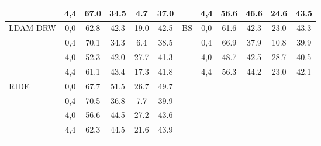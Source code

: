 \documentclass{article}
\newcommand{\thickhline}{\hlineB{4}}
\begin{document}
{\begin{table}[ht]
{{\begin{tabular}{l|c|cccc|l|c|cccc}
                          & 4,4            & 67.0                     & 34.5                    & 4.7                     & 37.0                    &                         & 4,4                  & 56.6                     & 46.6                    & 24.6                    & 43.5                    \\ \midrule
\multirow{4}{*}{LDAM-DRW} & 0,0            & 62.8                     & 42.3                    & 19.0                    & 42.5                    & \multirow{4}{*}{BS}     & 0,0                  & 61.6                     & 42.3                    & 23.0                    & 43.3                    \\
                          & 0,4            & 70.1                     & 34.3                    & 6.4                     & 38.5                    &                         & 0,4                  & 66.9                     & 37.9                    & 10.8                    & 39.9                    \\
                          & 4,0            & 52.3                     & 42.0                    & 27.7                    & 41.3                    &                         & 4,0                  & 48.7                     & 42.5                    & 28.7                    & 40.5                    \\
                          & 4,4            & 61.1                     & 43.4                    & 17.3                    & 41.8                    &                         & 4,4                  & 56.3                     & 44.2                    & 23.0                    & 42.1                    \\ \midrule
\multirow{4}{*}{RIDE}     & 0,0            & 67.7                     & 51.5                    & 26.7                    & 49.7                    &  \multicolumn{1}{l}{} & \multicolumn{1}{l}{} & \multicolumn{1}{l}{}     & \multicolumn{1}{l}{}    & \multicolumn{1}{l}{}    & \multicolumn{1}{l}{}    \\
                          & 0,4            & 70.5                     & 36.8                    & 7.7                     & 39.9                    & \multicolumn{1}{r}{}    & \multicolumn{1}{r}{} & \multicolumn{1}{l}{}     & \multicolumn{1}{l}{}    & \multicolumn{1}{l}{}    & \multicolumn{1}{l}{}    \\
                          & 4,0            & 56.6                     & 44.5                    & 27.2                    & 43.6                    & \multicolumn{1}{r}{}    & \multicolumn{1}{r}{} & \multicolumn{1}{l}{}     & \multicolumn{1}{l}{}    & \multicolumn{1}{l}{}    & \multicolumn{1}{l}{}    \\
                          & 4,4            & 62.3                     & 44.5                    & 21.6                    & 43.9                    & \multicolumn{1}{r}{}    & \multicolumn{1}{r}{} & \multicolumn{1}{l}{}     & \multicolumn{1}{l}{}    & \multicolumn{1}{l}{}    & \multicolumn{1}{l}{}   \\
\thickhline
\end{tabular}}}
\end{table} }
\end{document}
